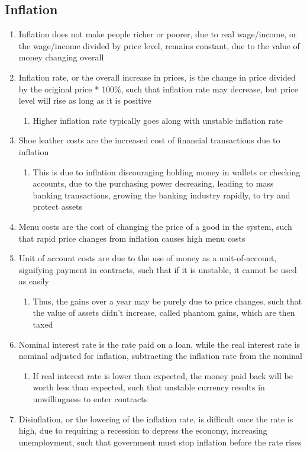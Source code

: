 \documentclass[11 pt, twoside]{article}
\begin{document}
\subsection{Inflation}
\begin{enumerate}
\item Inflation does not make people richer or poorer, due to real wage/income, or the wage/income divided by price level, remains constant, due to the value of money changing overall
\item Inflation rate, or the overall increase in prices, is the change in price divided by the original price * 100\%, such that inflation rate may decrease, but price level will rise as long as it is positive
\begin{enumerate}
\item Higher inflation rate typically goes along with unstable inflation rate
\end{enumerate}
\item Shoe leather costs are the increased cost of financial transactions due to inflation
\begin{enumerate} 
\item This is due to inflation discouraging holding money in wallets or checking accounts, due to the purchasing power decreasing, leading to mass banking transactions, growing the banking industry rapidly, to try and protect assets
\end{enumerate}
\item Menu costs are the cost of changing the price of a good in the system, such that rapid price changes from inflation causes high menu costs
\item Unit of account costs are due to the use of money as a unit-of-account, signifying payment in contracts, such that if it is unstable, it cannot be used as easily
\begin{enumerate}
\item Thus, the gains over a year may be purely due to price changes, such that the value of assets didn't increase, called phantom gains, which are then taxed
\end{enumerate}
\item Nominal interest rate is the rate paid on a loan, while the real interest rate is nominal adjusted for inflation, subtracting the inflation rate from the nominal
\begin{enumerate}
\item If real interest rate is lower than expected, the money paid back will be worth less than expected, such that unstable currency results in unwillingness to enter contracts
\end{enumerate}
\item Disinflation, or the lowering of the inflation rate, is difficult once the rate is high, due to requiring a recession to depress the economy, increasing unemployment, such that government must stop inflation before the rate rises
\end{enumerate}
\end{document}
